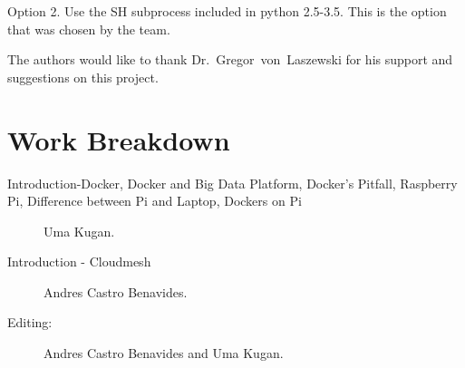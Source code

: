 Option 2. Use the SH subprocess included in python 2.5-3.5.  This is
the option that was chosen by the team.
	
	
\begin{acks}
	The authors would like to thank Dr.~Gregor~von~Laszewski for his
  support and suggestions on this project.
\end{acks}
	


	
\newpage
	
\appendix
	
\section{Work Breakdown}
	
\begin{description}
		
		\item[Introduction-Docker, Docker and Big Data Platform, 
    Docker's Pitfall, Raspberry Pi, Difference between Pi and Laptop, Dockers on Pi] Uma Kugan.
		\item[Introduction - Cloudmesh] Andres Castro Benavides.
		
		\item[Editing:] Andres Castro Benavides and Uma Kugan.
		
\end{description}
	

